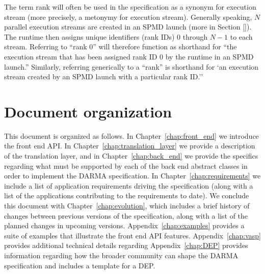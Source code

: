 \begin{compactdesc}
The term rank will often be used in the specification as a synonym for execution stream (more precisely, a metonymy for execution stream).
Generally speaking, $N$ parallel execution streams are created in an SPMD launch (more in Section \ref{}).
The runtime then assigns unique identifiers (rank IDs) $0$ through $N-1$ to each stream.
Referring to ``rank 0'' will therefore function as shorthand for ``the execution stream that has been assigned rank ID 0 by the runtime in an SPMD launch.''
Similarly, referring generically to a ``rank'' is shorthand for `an execution stream created by an SPMD launch with a particular rank ID.''
\end{compactdesc} 









\section{Document organization}
\label{sec:organization}
This document is organized as follows.  In Chapter~\ref{chap:front_end} we
introduce the \gls{front end} \gls{API}.  In
Chapter~\ref{chap:translation_layer} we
provide a description of the \gls{translation layer}, and in
Chapter~\ref{chap:back_end} we provide the specifics regarding what must be
supported by each of the \gls{back end} abstract classes in order to implement
the DARMA specification. In Chapter~\ref{chap:requirements} we include a list
of application requirements driving the specification (along with a list of the
    applications contributing to the requirements to date).
We conclude this document with
Chapter~\ref{chap:evolution}, which includes a brief history of changes between
previous versions of the specification, along with a list of the planned changes 
in upcoming versions.
Appendix~\ref{chap:examples} provides a suite of examples that illustrate the
 \gls{front end} \gls{API} features. Appendix~\ref{chap:vasp} provides
additional technical details regarding %
Appendix~\ref{chap:DEP} provides information regarding how the broader
community can shape the \gls{DARMA} specification and includes a template for 
a \gls{DEP}. 

